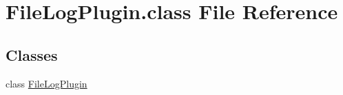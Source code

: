 \hypertarget{FileLogPlugin_8class}{\section{File\-Log\-Plugin.\-class File Reference}
\label{FileLogPlugin_8class}
}
\subsection*{Classes}
\begin{DoxyCompactItemize}
\item 
class \hyperlink{classFileLogPlugin}{File\-Log\-Plugin}
\end{DoxyCompactItemize}
